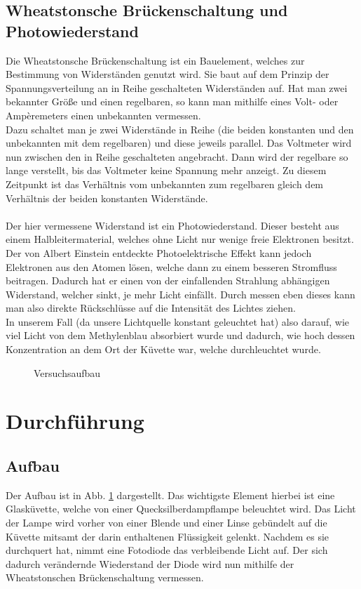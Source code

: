 \documentclass[12pt,a4paper,titlepage,headinclude,bibtotoc]{scrartcl}
\begin{document}
\subsection{Wheatstonsche Brückenschaltung und Photowiederstand}
Die Wheatstonsche Brückenschaltung ist ein Bauelement, welches zur Bestimmung von Widerständen genutzt wird.
Sie baut auf dem Prinzip der Spannungsverteilung an in Reihe geschalteten Widerständen auf.
Hat man zwei bekannter Größe und einen regelbaren, so kann man mithilfe eines Volt- oder Ampèremeters einen unbekannten vermessen.\\
Dazu schaltet man je zwei Widerstände in Reihe (die beiden konstanten und den unbekannten mit dem regelbaren) und diese jeweils parallel.
Das Voltmeter wird nun zwischen den in Reihe geschalteten angebracht.
Dann wird der regelbare so lange verstellt, bis das Voltmeter keine Spannung mehr anzeigt.
Zu diesem Zeitpunkt ist das Verhältnis vom unbekannten zum regelbaren gleich dem Verhältnis der beiden konstanten Widerstände.\\\\
Der hier vermessene Widerstand ist ein Photowiederstand. 
Dieser besteht aus einem Halbleitermaterial, welches ohne Licht nur wenige freie Elektronen besitzt.
Der von Albert Einstein entdeckte Photoelektrische Effekt kann jedoch Elektronen aus den Atomen lösen, welche dann zu einem besseren Stromfluss beitragen.
Dadurch hat er einen von der einfallenden Strahlung abhängigen Widerstand, welcher sinkt, je mehr Licht einfällt.
Durch messen eben dieses kann man also direkte Rückschlüsse auf die Intensität des Lichtes ziehen.\\
In unserem Fall (da unsere Lichtquelle konstant geleuchtet hat) also darauf, wie viel Licht von dem Methylenblau absorbiert wurde und dadurch, wie hoch dessen Konzentration an dem Ort der Küvette war, welche durchleuchtet wurde.
\begin{figure}[!b]
 \centering
 \def\svgwidth{0.8\columnwidth}
 
 \caption{Versuchsaufbau\label{fig:aufbau}}
\end{figure}

\section{Durchführung}
\label{sec:durchfuehrung}
\subsection{Aufbau}
Der Aufbau ist in Abb. \ref{fig:aufbau} dargestellt.
Das wichtigste Element hierbei ist eine Glasküvette, welche von einer Quecksilberdampflampe beleuchtet wird.
Das Licht der Lampe wird vorher von einer Blende und einer Linse gebündelt auf die Küvette mitsamt der darin enthaltenen Flüssigkeit gelenkt.
Nachdem es sie durchquert hat, nimmt eine Fotodiode das verbleibende Licht auf.
Der sich dadurch verändernde Wiederstand der Diode wird nun mithilfe der Wheatstonschen Brückenschaltung vermessen.
\end{document}
